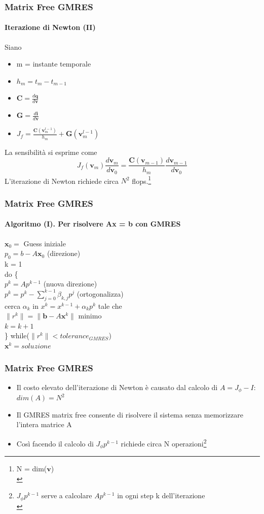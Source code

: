 \documentclass[10pt]{beamer}
\begin{document}
\begin{frame}
\frametitle{Matrix Free GMRES}
\framesubtitle{Iterazione di Newton (II)}
Siano\\
\begin{itemize}
\item m = instante temporale%
\item $h_m = t_m - t_{m-1}$
\item $\mathbf{C} = \frac{d\mathbf{q}}{d\mathbf{v}}$
\item $\mathbf{G} = \frac{d\mathbf{i}}{d\mathbf{v}}$ 
\item $J_f = \frac{\mathbf{C}(\mathbf{v}_m^{l-1})}{h_m} + \mathbf{G}(\mathbf{v}_m^{l-1})$
\end{itemize}
 La sensibilità si esprime come
 \begin{equation}
J_f(\mathbf{v}_m)\frac{d\mathbf{v}_m}{d\mathbf{v}_0} = \frac{\mathbf{C}(\mathbf{v}_{m-1})}{h_m}\frac{d\mathbf{v}_{m-1}}{d\mathbf{v}_0}
\tag{11}
\end{equation}
L'iterazione di Newton richiede circa $N^2$ flops.\footnote{N = dim($\mathbf{v}$)\\}
\end{frame}

\begin{frame}
\frametitle{Matrix Free GMRES}\framesubtitle{\textbf{Algoritmo (I)}. Per risolvere Ax = b con GMRES}

$\mathbf{x}_0 =$ Guess iniziale\\
$p_0 = b - A\mathbf{x}_0$ (direzione)\\
k = 1\\
do \{\\
$p^k = Ap^{k-1}$ (nuova direzione)\\
$p^k = p^k -\sum\limits_{j=0}^{k-1}\beta_{k,j}p^j$ (ortogonalizza)\\
cerca $\alpha_k$ in $x^k = x^{k -1} + \alpha_kp^k$ tale che\\
$\|r^k\| = \|\mathbf{b} - A\mathbf{x}^k\|$ minimo\\
$k = k + 1$\\
\} while($\|r^k\| < tolerance_{GMRES}$)\\
$\mathbf{x}^k = soluzione$
    
\end{frame}

\begin{frame}
\frametitle{Matrix Free GMRES}
\begin{itemize}
\item Il costo elevato dell'iterazione di Newton è causato dal calcolo di $ A = J_\phi - I$: $dim(A) = N^2$
\item Il GMRES matrix free consente di risolvere il sistema senza memorizzare l'intera matrice A  
\item 
Così facendo il calcolo di $J_\phi p^{k-1}$ richiede circa N operazioni\footnote{$J_\phi p^{k-1}$ serve a calcolare $Ap^{k-1}$ in ogni step k dell'iterazione \\}
\end{itemize}
\end{frame}
\end{document}

